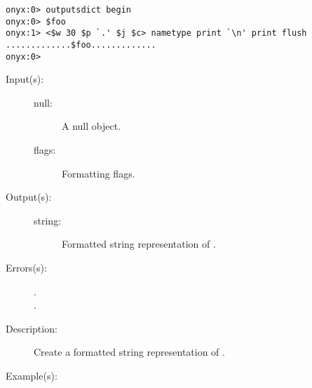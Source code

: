 \begin{description}
\begin{description}
\begin{verbatim}
onyx:0> outputsdict begin
onyx:0> $foo
onyx:1> <$w 30 $p `.' $j $c> nametype print `\n' print flush
.............$foo.............
onyx:0>
		\end{verbatim}
	\end{description}
\label{outputsdict:nulltype}
\item[{\onyxop{null flags}{nulltype}{string}}: ]
	\begin{description}\item[]
	\item[Input(s): ]
		\begin{description}\item[]
		\item[null: ]
			A null object.
		\item[flags: ]
			Formatting flags.
		\end{description}
	\item[Output(s): ]
		\begin{description}\item[]
		\item[string: ]
			Formatted string representation of .
		\end{description}
	\item[Errors(s): ]
		\begin{description}\item[]
		\item[.]
		\item[.]
		\end{description}
	\item[Description: ]
		Create a formatted string representation of .
	\item[Example(s): ]\begin{verbatim}


\end{verbatim}
\end{description}
\end{description}
